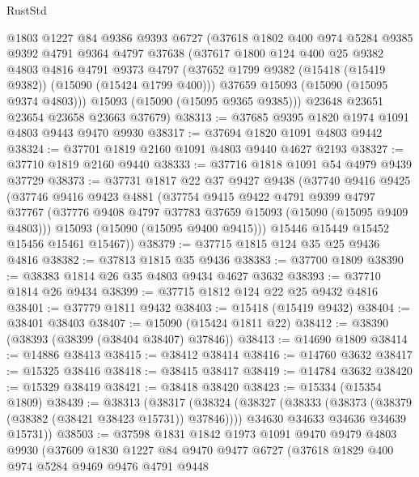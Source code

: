 \begin{lexlean}{RustStd}
\begin{coremodule}
      @1803
      @1227
      @84
      @9386
      @9393
      @6727
      (@37618
        @1802
        @400
        @974
        @5284
        @9385
        @9392
        @4791
        @9364
        @4797
        @37638
        (@37617
          @1800
          @124
          @400
          @25
          @9382
          @4803
          @4816
          @4791
          @9373
          @4797
          (@37652 @1799 @9382 (@15418 (@15419 @9382)) (@15090 (@15424 @1799 @400)))
          @37659
          @15093
          (@15090 (@15095 @9374 @4803)))
        @15093
        (@15090 (@15095 @9365 @9385)))
      @23648
      @23651
      @23654
      @23658
      @23663
      @37679)
@38313 := @37685 @9395 @1820 @1974 @1091 @4803 @9443 @9470 @9930
@38317 := @37694 @1820 @1091 @4803 @9442
@38324 := @37701 @1819 @2160 @1091 @4803 @9440 @4627 @2193
@38327 := @37710 @1819 @2160 @9440
@38333 := @37716 @1818 @1091 @54 @4979 @9439 @37729
@38373 := @37731
    @1817
    @22
    @37
    @9427
    @9438
    (@37740
      @9416
      @9425
      (@37746
        @9416
        @9423
        @4881
        (@37754
          @9415
          @9422
          @4791
          @9399
          @4797
          @37767
          (@37776 @9408 @4797 @37783 @37659 @15093 (@15090 (@15095 @9409 @4803)))
          @15093
          (@15090 (@15095 @9400 @9415)))
        @15446
        @15449
        @15452
        @15456
        @15461
        @15467))
@38379 := @37715 @1815 @124 @35 @25 @9436 @4816
@38382 := @37813 @1815 @35 @9436
@38383 := @37700 @1809
@38390 := @38383 @1814 @26 @35 @4803 @9434 @4627 @3632
@38393 := @37710 @1814 @26 @9434
@38399 := @37715 @1812 @124 @22 @25 @9432 @4816
@38401 := @37779 @1811 @9432
@38403 := @15418 (@15419 @9432)
@38404 := @38401 @38403
@38407 := @15090 (@15424 @1811 @22)
@38412 := @38390 (@38393 (@38399 (@38404 @38407) @37846))
@38413 := @14690 @1809
@38414 := @14886 @38413
@38415 := @38412 @38414
@38416 := @14760 @3632
@38417 := @15325 @38416
@38418 := @38415 @38417
@38419 := @14784 @3632
@38420 := @15329 @38419
@38421 := @38418 @38420
@38423 := @15334 (@15354 @1809)
@38439 := @38313
    (@38317
      (@38324
        (@38327 (@38333 (@38373 (@38379 (@38382 (@38421 @38423 @15731)) @37846))))
        @34630
        @34633
        @34636
        @34639
        @15731))
@38503 := @37598
    @1831
    @1842
    @1973
    @1091
    @9470
    @9479
    @4803
    @9930
    (@37609
      @1830
      @1227
      @84
      @9470
      @9477
      @6727
      (@37618
        @1829
        @400
        @974
        @5284
        @9469
        @9476
        @4791
        @9448

\end{coremodule}
\end{lexlean}
